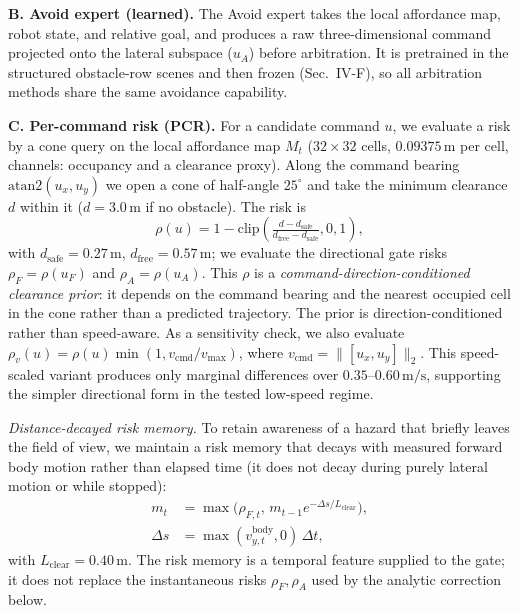 \documentclass[letterpaper, 10 pt, conference]{ieeeconf}
\newcommand{\uF}{u_{F}}
\newcommand{\uA}{u_{A}}
\newcommand{\rFdir}{\rho_F}
\newcommand{\rAdir}{\rho_A}
\newcommand{\msec}{\,\mathrm{m/s}}
\begin{document}
\textbf{B. Avoid expert (learned).}
The Avoid expert takes the local affordance map, robot state, and relative
goal, and produces a raw three-dimensional command projected onto the
lateral subspace ($\uA$) before arbitration. It is pretrained in the
structured obstacle-row scenes and then frozen (Sec.~IV-F), so all
arbitration methods share the same avoidance capability.

\textbf{C. Per-command risk (PCR).}
For a candidate command $u$, we evaluate a risk by a cone query on the
local affordance map $M_t$ ($32\times32$ cells, $0.09375\,\mathrm{m}$ per
cell, channels: occupancy and a clearance proxy). Along the command
bearing $\mathrm{atan2}(u_x,u_y)$ we open a cone of half-angle $25^\circ$
and take the minimum clearance $d$ within it ($d=3.0\,\mathrm{m}$ if no
obstacle). The risk is
\begin{equation}
\rho(u)=1-\mathrm{clip}\!\left(\tfrac{d-d_{\mathrm{safe}}}
{d_{\mathrm{free}}-d_{\mathrm{safe}}},0,1\right),
\end{equation}
with $d_{\mathrm{safe}}=0.27\,\mathrm{m}$, $d_{\mathrm{free}}=0.57\,
\mathrm{m}$; we evaluate the directional gate risks
$\rFdir=\rho(\uF)$ and $\rAdir=\rho(\uA)$. This $\rho$ is a
\emph{command-direction-conditioned clearance prior}: it depends on the
command bearing and the nearest occupied cell in the cone rather than a
predicted trajectory. The prior is direction-conditioned rather than
speed-aware. As a sensitivity check, we also evaluate
$\rho_v(u)=\rho(u)\min(1,v_{\mathrm{cmd}}/v_{\max})$, where
$v_{\mathrm{cmd}}=\|[u_x,u_y]\|_2$. This speed-scaled variant produces only
marginal differences over $0.35$--$0.60\msec$, supporting the simpler
directional form in the tested low-speed regime.

\emph{Distance-decayed risk memory.} To retain awareness of a hazard that
briefly leaves the field of view, we maintain a risk memory that decays
with measured forward body motion rather than elapsed time (it does not
decay during purely lateral motion or while stopped):
\begin{equation}
\begin{aligned}
m_t &= \max\!\big(\rho_{F,t},\,m_{t-1}e^{-\Delta s/L_{\mathrm{clear}}}\big),\\
\Delta s &= \max(v_{y,t}^{\mathrm{body}},0)\,\Delta t ,
\end{aligned}
\end{equation}
with $L_{\mathrm{clear}}=0.40\,\mathrm{m}$. The risk memory is a temporal
feature supplied to the gate; it does not replace the instantaneous risks
$\rFdir,\rAdir$ used by the analytic correction below.
\end{document}
